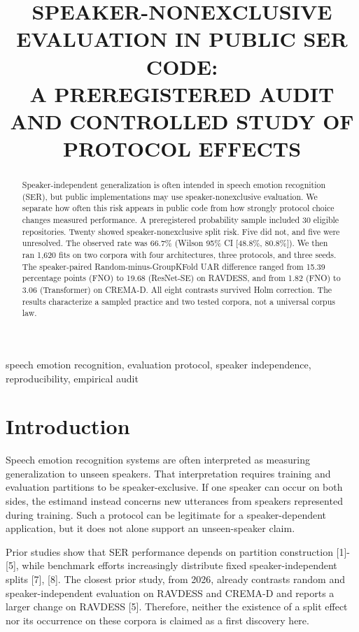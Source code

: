 \documentclass{article}
\title{SPEAKER-NONEXCLUSIVE EVALUATION IN PUBLIC SER CODE:\\
A PREREGISTERED AUDIT AND CONTROLLED STUDY OF PROTOCOL EFFECTS}
\begin{document}
\maketitle
\begin{abstract}
Speaker-independent generalization is often intended in speech emotion recognition (SER), but public implementations may use speaker-nonexclusive evaluation.
We separate how often this risk appears in public code from how strongly protocol choice changes measured performance.
A preregistered probability sample included 30 eligible repositories.
Twenty showed speaker-nonexclusive split risk.
Five did not, and five were unresolved.
The observed rate was 66.7\% (Wilson 95\% CI [48.8\%, 80.8\%]).
We then ran 1,620 fits on two corpora with four architectures, three protocols, and three seeds.
The speaker-paired Random-minus-GroupKFold UAR difference ranged from 15.39 percentage points (FNO) to 19.68 (ResNet-SE) on RAVDESS, and from 1.82 (FNO) to 3.06 (Transformer) on CREMA-D.
All eight contrasts survived Holm correction.
The results characterize a sampled practice and two tested corpora, not a universal corpus law.
\end{abstract}
\begin{keywords}
speech emotion recognition, evaluation protocol, speaker independence, reproducibility, empirical audit
\end{keywords}
\section{Introduction}

Speech emotion recognition systems are often interpreted as measuring generalization to unseen speakers.
That interpretation requires training and evaluation partitions to be speaker-exclusive.
If one speaker can occur on both sides, the estimand instead concerns new utterances from speakers represented during training.
Such a protocol can be legitimate for a speaker-dependent application, but it does not alone support an unseen-speaker claim.

Prior studies show that SER performance depends on partition construction [1]-[5], while benchmark efforts increasingly distribute fixed speaker-independent splits [7], [8].
The closest prior study, from 2026, already contrasts random and speaker-independent evaluation on RAVDESS and CREMA-D and reports a larger change on RAVDESS [5].
Therefore, neither the existence of a split effect nor its occurrence on these corpora is claimed as a first discovery here.
\end{document}
